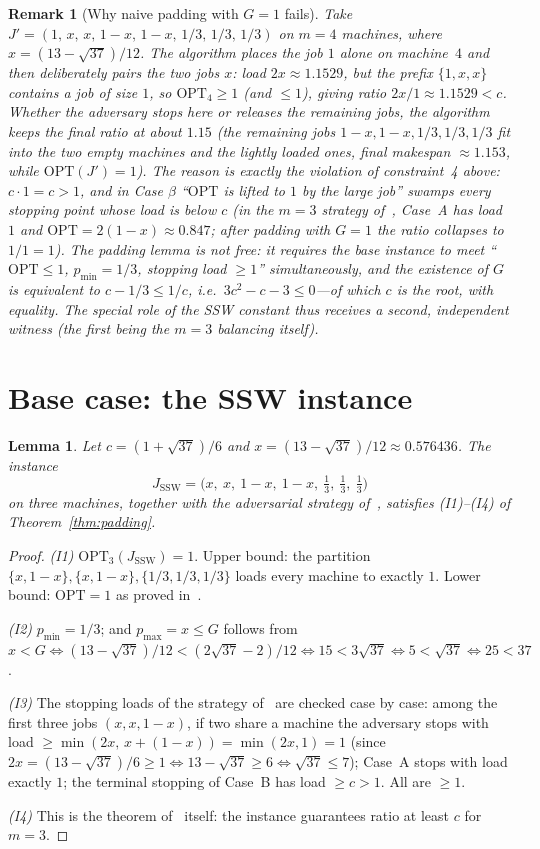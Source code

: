 \documentclass[11pt]{article}
\newtheorem{lemma}[theorem]{Lemma}
\newtheorem{remark}[theorem]{Remark}
\theoremstyle{definition}
\newcommand{\opt}{\mathrm{OPT}}
\begin{document}
\begin{remark}[Why naive padding with $G=1$ fails]
\label{rem:g1fails}
Take $J'=(1,\,x,\,x,\,1-x,\,1-x,\,1/3,\,1/3,\,1/3)$ on $m=4$ machines,
where $x=(13-\sqrt{37})/12$. The algorithm places the job $1$ alone on
machine~$4$ and then \emph{deliberately pairs the two jobs $x$}: load
$2x\approx1.1529$, but the prefix $\{1,x,x\}$ contains a job of size $1$, so
$\opt_{4}\ge1$ (and $\le1$), giving ratio $2x/1\approx1.1529<c$. Whether
the adversary stops here or releases the remaining jobs, the algorithm keeps
the final ratio at about $1.15$ (the remaining jobs $1-x,1-x,1/3,1/3,1/3$
fit into the two empty machines and the lightly loaded ones, final makespan
$\approx1.153$, while $\opt(J')=1$). The reason is exactly the violation of
constraint~4 above: $c\cdot1=c>1$, and in Case $\beta$ ``$\opt$ is lifted
to $1$ by the large job'' swamps every stopping point whose load is below
$c$ (in the $m=3$ strategy of~\cite{SSW00}, Case~A has load $1$ and
$\opt=2(1-x)\approx0.847$; after padding with $G=1$ the ratio collapses to
$1/1=1$). The padding lemma is not free: it requires the base instance to
meet ``$\opt\le1$, $p_{\min}=1/3$, stopping load $\ge1$'' simultaneously, and
the existence of $G$ is equivalent to $c-1/3\le1/c$, i.e.\
$3c^{2}-c-3\le0$---of which $c$ is the root, with equality. The special
role of the SSW constant thus receives a second, independent witness
(the first being the $m=3$ balancing itself).
\end{remark}

\section{Base case: the SSW instance}
\label{sec:base}

\begin{lemma}
\label{lem:base}
Let $c=(1+\sqrt{37})/6$ and $x=(13-\sqrt{37})/12\approx0.576436$. The
instance
\[
J_{\mathrm{SSW}}=\bigl(x,\ x,\ 1-x,\ 1-x,\ \tfrac13,\ \tfrac13,\ \tfrac13\bigr)
\]
on three machines, together with the adversarial strategy of~\cite{SSW00},
satisfies \emph{(I1)--(I4)} of Theorem~\ref{thm:padding}.
\end{lemma}
\begin{proof}
\emph{(I1)} $\opt_{3}(J_{\mathrm{SSW}})=1$. Upper bound: the partition
$\{x,1-x\},\{x,1-x\},\{1/3,1/3,1/3\}$ loads every machine to exactly $1$.
Lower bound: $\opt=1$ as proved in~\cite{SSW00}.

\emph{(I2)} $p_{\min}=1/3$; and $p_{\max}=x\le G$ follows from
$x<G\iff(13-\sqrt{37})/12<(2\sqrt{37}-2)/12\iff15<3\sqrt{37}\iff5<\sqrt{37}
\iff25<37$.

\emph{(I3)} The stopping loads of the strategy of~\cite{SSW00} are checked
case by case: among the first three jobs $(x,x,1-x)$, if two share a
machine the adversary stops with load
$\ge\min(2x,\,x+(1-x))=\min(2x,1)=1$ (since
$2x=(13-\sqrt{37})/6\ge1\iff13-\sqrt{37}\ge6\iff\sqrt{37}\le7$); Case~A
stops with load exactly $1$; the terminal stopping of Case~B has load
$\ge c>1$. All are $\ge1$.

\emph{(I4)} This is the theorem of~\cite{SSW00} itself: the instance
guarantees ratio at least $c$ for $m=3$.
\end{proof}
\end{document}
